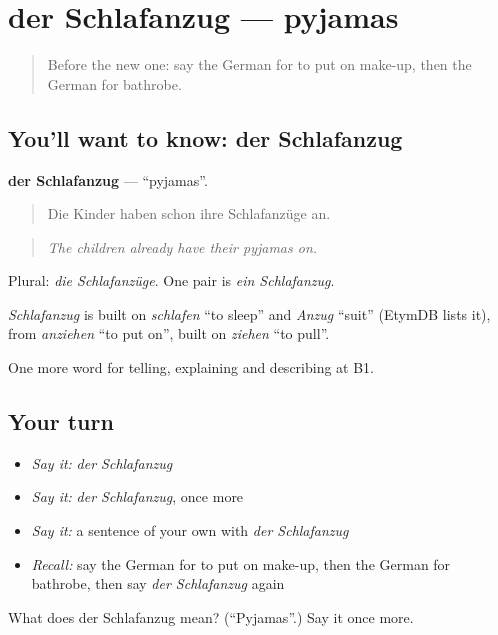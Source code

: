 \section[der Schlafanzug]{der Schlafanzug — pyjamas}

\label{lesson:GE-C530-schlafanzug}



\begin{quote}
Before the new one: say the German for to put on make-up, then the German for bathrobe.
\end{quote}

\subsection*{You'll want to know: der Schlafanzug}
\textbf{der Schlafanzug} — \textquotedblleft{}pyjamas\textquotedblright{}.

\begin{quote}
Die Kinder haben schon ihre Schlafanzüge an.
\end{quote}

\begin{quote}
\emph{The children already have their pyjamas on.}
\end{quote}

Plural: \emph{die Schlafanzüge}. One pair is \emph{ein Schlafanzug}.

\begin{cousinweb}
\emph{Schlafanzug} is built on \emph{schlafen} \textquotedblleft{}to sleep\textquotedblright{} and \emph{Anzug} \textquotedblleft{}suit\textquotedblright{} (EtymDB lists it), from \emph{anziehen} \textquotedblleft{}to put on\textquotedblright{}, built on \emph{ziehen} \textquotedblleft{}to pull\textquotedblright{}.
\end{cousinweb}

\begin{grammarlens}[title={What you've built}]
One more word for telling, explaining and describing at B1.
\end{grammarlens}

\subsection*{Your turn}
\begin{itemize}
\raggedright
  \item \emph{Say it:} \emph{der Schlafanzug}
  \item \emph{Say it:} \emph{der Schlafanzug}, once more
  \item \emph{Say it:} a sentence of your own with \emph{der Schlafanzug}
  \item \emph{Recall:} say the German for to put on make-up, then the German for bathrobe, then say \emph{der Schlafanzug} again
\end{itemize}

\begin{tcolorbox}[breakable,colback=teal!4,colframe=teal!35!black,title={Before you move on}]
What does der Schlafanzug mean? (\textquotedblleft{}Pyjamas\textquotedblright{}.) Say it once more.
\end{tcolorbox}
